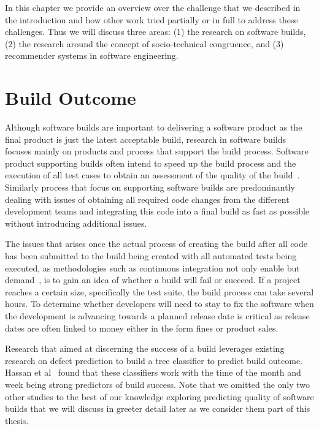 \label{chap:bg}
In this chapter we provide an overview over the challenge that we described in the introduction and how other work tried partially or in full to address these challenges.
Thus we will discuss three areas: (1) the research on software builds, (2) the research around the concept of socio-technical congruence, and (3) recommender systems in software engineering.

\section{Build Outcome}
Although software builds are important to delivering a software product as the final product is just the latest acceptable build, research in software builds focuses mainly on products and process that support the build process.
Software product supporting builds often intend to speed up the build process and the execution of all test cases to obtain an assessment of the quality of the build~\cite{maraia:book:2005}.
Similarly process that focus on supporting software builds are predominantly dealing with issues of obtaining all required code changes from the different development teams and integrating this code into a final build as fast as possible without introducing additional issues.

The issues that arises once the actual process of creating the build after all code has been submitted to the build being created with all automated tests being executed, as methodologies such as continuous integration not only enable but demand~\cite{duvall:book:2007}, is to gain an idea of whether a build will fail or succeed.
If a project reaches a certain size, specifically the test suite, the build process can take several hours.
To determine whether developers will need to stay to fix the software when the development is advancing towards a planned release date is critical as release dates are often linked to money either in the form fines or product sales.

Research that aimed at discerning the success of a build leverages existing research on defect prediction to build a tree classifier to predict build outcome.
Hassan et al~\cite{hassan:ase:2006} found that these classifiers work with the time of the month and week being strong predictors of build success.
Note that we omitted the only two other studies to the best of our knowledge exploring predicting quality of software builds that we will discuss in greeter detail later as we consider them part of this thesis.

